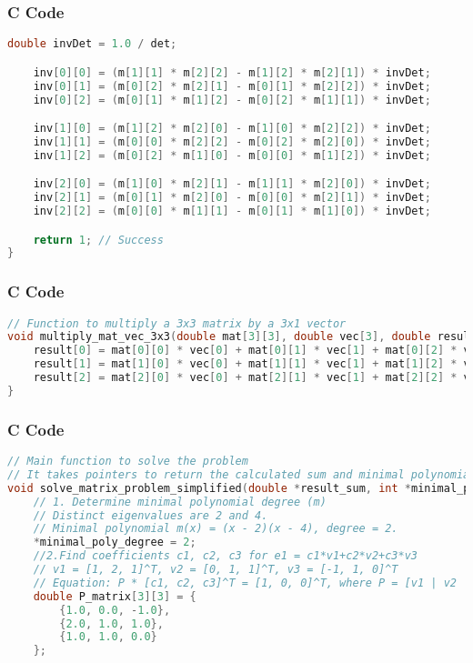 \documentclass{beamer}
\begin{document}
\begin{frame}[fragile]
\frametitle{C Code}
\begin{lstlisting}[language=C]
    double invDet = 1.0 / det;

    inv[0][0] = (m[1][1] * m[2][2] - m[1][2] * m[2][1]) * invDet;
    inv[0][1] = (m[0][2] * m[2][1] - m[0][1] * m[2][2]) * invDet;
    inv[0][2] = (m[0][1] * m[1][2] - m[0][2] * m[1][1]) * invDet;

    inv[1][0] = (m[1][2] * m[2][0] - m[1][0] * m[2][2]) * invDet;
    inv[1][1] = (m[0][0] * m[2][2] - m[0][2] * m[2][0]) * invDet;
    inv[1][2] = (m[0][2] * m[1][0] - m[0][0] * m[1][2]) * invDet;

    inv[2][0] = (m[1][0] * m[2][1] - m[1][1] * m[2][0]) * invDet;
    inv[2][1] = (m[0][1] * m[2][0] - m[0][0] * m[2][1]) * invDet;
    inv[2][2] = (m[0][0] * m[1][1] - m[0][1] * m[1][0]) * invDet;

    return 1; // Success
}
\end{lstlisting}
\end{frame}

\begin{frame}[fragile]
\frametitle{C Code}
\begin{lstlisting}[language=C]
// Function to multiply a 3x3 matrix by a 3x1 vector
void multiply_mat_vec_3x3(double mat[3][3], double vec[3], double result[3]) {
    result[0] = mat[0][0] * vec[0] + mat[0][1] * vec[1] + mat[0][2] * vec[2];
    result[1] = mat[1][0] * vec[0] + mat[1][1] * vec[1] + mat[1][2] * vec[2];
    result[2] = mat[2][0] * vec[0] + mat[2][1] * vec[1] + mat[2][2] * vec[2];
}
\end{lstlisting}
\end{frame}

\begin{frame}[fragile]
\frametitle{C Code}
\begin{lstlisting}[language=C]
// Main function to solve the problem
// It takes pointers to return the calculated sum and minimal polynomial degree
void solve_matrix_problem_simplified(double *result_sum, int *minimal_poly_degree) {
    // 1. Determine minimal polynomial degree (m)
    // Distinct eigenvalues are 2 and 4.
    // Minimal polynomial m(x) = (x - 2)(x - 4), degree = 2.
    *minimal_poly_degree = 2;
    //2.Find coefficients c1, c2, c3 for e1 = c1*v1+c2*v2+c3*v3
    // v1 = [1, 2, 1]^T, v2 = [0, 1, 1]^T, v3 = [-1, 1, 0]^T
    // Equation: P * [c1, c2, c3]^T = [1, 0, 0]^T, where P = [v1 | v2 | v3]
    double P_matrix[3][3] = {
        {1.0, 0.0, -1.0},
        {2.0, 1.0, 1.0},
        {1.0, 1.0, 0.0}
    };
\end{lstlisting}
\end{frame}
\end{document}
